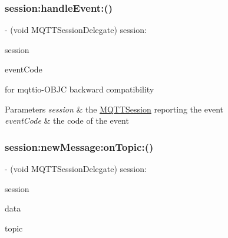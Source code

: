 \subsubsection{\texorpdfstring{session\+:handle\+Event\+:()}{session:handleEvent:()}}
{\footnotesize\ttfamily -\/ (void M\+Q\+T\+T\+Session\+Delegate) session\+: \begin{DoxyParamCaption}\item[{(\hyperlink{interface_m_q_t_t_session}{M\+Q\+T\+T\+Session} $\ast$)}]{session }\item[{handleEvent:(M\+Q\+T\+T\+Session\+Event)}]{event\+Code }\end{DoxyParamCaption}\hspace{0.3cm}{\ttfamily [optional]}}

for mqttio-\/\+O\+B\+JC backward compatibility 
\begin{DoxyParams}{Parameters}
{\em session} & the \hyperlink{interface_m_q_t_t_session}{M\+Q\+T\+T\+Session} reporting the event \\
\hline
{\em event\+Code} & the code of the event \\
\hline
\end{DoxyParams}
\mbox{\label{protocol_m_q_t_t_session_delegate_01-p_aacbda6f90a303f2f1a24cc364ba0f1d5}} 
\subsubsection{\texorpdfstring{session\+:new\+Message\+:on\+Topic\+:()}{session:newMessage:onTopic:()}}
{\footnotesize\ttfamily -\/ (void M\+Q\+T\+T\+Session\+Delegate) session\+: \begin{DoxyParamCaption}\item[{(\hyperlink{interface_m_q_t_t_session}{M\+Q\+T\+T\+Session} $\ast$)}]{session }\item[{newMessage:(N\+S\+Data $\ast$)}]{data }\item[{onTopic:(N\+S\+String $\ast$)}]{topic }\end{DoxyParamCaption}\hspace{0.3cm}{\ttfamily [optional]}}

